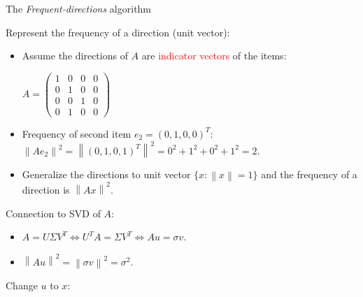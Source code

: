 \documentclass[first=dgreen,second=purple,logo=redque]{aaltoslides}
\newcommand{\vectornorm}[1]{\left\|#1\right\|}
\begin{document}

\begin{frame}[allowframebreaks=1]{The \textit{Frequent-directions} algorithm}


Represent the \textcolor{dgreen}{frequency} of a direction (unit vector):
\begin{itemize}
  \item Assume the directions of $A$ are \textcolor{red}{indicator vectors} of the items: \\
  \begin{center}
  \vspace{2 mm}
  $A = \begin{pmatrix}
       1 & 0 & 0 & 0\\[0.3em] 
       0 & 1 & 0 & 0\\[0.3em]
       0 & 0 & 1 & 0\\[0.3em]
       0 & 1 & 0 & 0
     \end{pmatrix}$
  \end{center}
  \item Frequency of second item $e_2 = (0,1,0,0)^T$:
  $ \vectornorm{Ae_2}^2 = \vectornorm{(0,1,0,1)^T} ^2= 0^2 + 1^2 + 0^2 + 1^2 = 2$. 
  \item Generalize the directions to unit vector $\{x : \vectornorm{x}=1\} $ and the \textcolor{dgreen}{frequency} of a direction is $\vectornorm{Ax}^2$.
\end{itemize}

\framebreak
Connection to SVD of $A$:
\begin{itemize}
  \item $A = U\Sigma V^T \Leftrightarrow U^TA = \Sigma V^T \Leftrightarrow Au = \sigma v$.
  \item $\vectornorm{Au}^2 = \vectornorm{\sigma v}^2 = \sigma^2$.
\end{itemize}
  \vspace{2 mm}
Change $u$ to $x$: \\
  \vspace{2 mm}


\end{frame}
\end{document}
